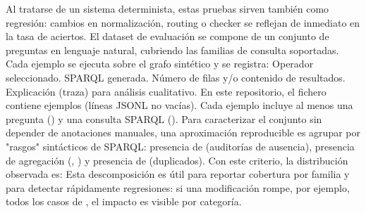 \markdownRendererUlEndTight \markdownRendererInterblockSeparator
{}Al tratarse de un sistema determinista, estas pruebas sirven también como regresión: cambios en normalización, routing o checker se reflejan de inmediato en la tasa de aciertos.\markdownRendererInterblockSeparator
{}\markdownRendererInterblockSeparator
{}El dataset de evaluación se compone de un conjunto de preguntas en lenguaje natural, cubriendo las familias de consulta soportadas. Cada ejemplo se ejecuta sobre el grafo sintético y se registra:\markdownRendererInterblockSeparator
{}\markdownRendererUlBeginTight
\markdownRendererUlItem Operador seleccionado.\markdownRendererUlItemEnd 
\markdownRendererUlItem SPARQL generada.\markdownRendererUlItemEnd 
\markdownRendererUlItem Número de filas y/o contenido de resultados.\markdownRendererUlItemEnd 
\markdownRendererUlItem Explicación (traza) para análisis cualitativo.\markdownRendererUlItemEnd 
\markdownRendererUlEndTight \markdownRendererInterblockSeparator
{}En este repositorio, el fichero  contiene  ejemplos (líneas JSONL no vacías). Cada ejemplo incluye al menos una pregunta () y una consulta SPARQL ().\markdownRendererInterblockSeparator
{}Para caracterizar el conjunto sin depender de anotaciones manuales, una aproximación reproducible es agrupar por "rasgos" sintácticos de SPARQL: presencia de  (auditorías de ausencia), presencia de agregación (, ) y presencia de  (duplicados). Con este criterio, la distribución observada es:\markdownRendererInterblockSeparator
{}\markdownRendererUlBeginTight
\markdownRendererUlItem {}\markdownRendererUlItemEnd 
\markdownRendererUlItem {}\markdownRendererUlItemEnd 
\markdownRendererUlItem {}\markdownRendererUlItemEnd 
\markdownRendererUlItem {}\markdownRendererUlItemEnd 
\markdownRendererUlEndTight \markdownRendererInterblockSeparator
{}Esta descomposición es útil para reportar cobertura por familia y para detectar rápidamente regresiones: si una modificación rompe, por ejemplo, todos los casos de , el impacto es visible por categoría.\markdownRendererInterblockSeparator

